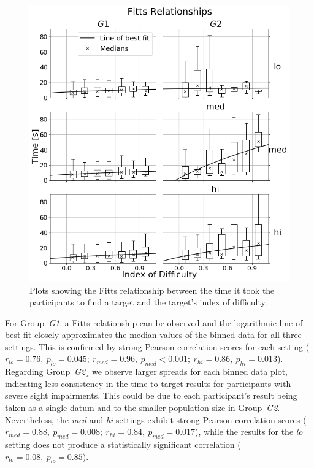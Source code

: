 \documentclass[]{interact}
\begin{document}
\begin{figure}
  \centering
  \includegraphics[width=1.0\textwidth]{figures/fitts_fit.png}
  \caption{Plots showing the Fitts relationship between the time it took the participants to find a target and the target's index of difficulty. }\label{fig:fitts-results}
\end{figure}

For Group~\textit{G1}, a Fitts relationship can be observed and the logarithmic line of best fit closely approximates the median values of the binned data for all three settings. 
This is confirmed by strong Pearson correlation scores for each setting ($r_{lo} = 0.76,~p_{lo} = 0.045;~r_{med} = 0.96,~p_{med}<0.001;~r_{hi} = 0.86,~p_{hi} = 0.013$).
Regarding Group~\textit{G2}¸ we observe larger spreads for each binned data plot, indicating less consistency in the time-to-target results for participants with severe sight impairments.
This could be due to each participant's result being taken as a single datum and to the smaller population size in Group~\textit{G2}.
Nevertheless, the \textit{med} and \textit{hi} settings exhibit strong Pearson correlation scores ($r_{med} = 0.88,~p_{med} = 0.008;~r_{hi} = 0.84,~p_{med} = 0.017$), while the results for the \textit{lo} setting does not produce a statistically significant correlation ($r_{lo} = 0.08,~p_{lo} = 0.85$).
\end{document}

